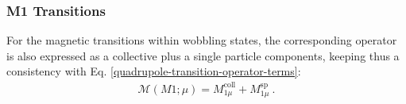 
\subsubsection{M1 Transitions}

For the magnetic transitions within wobbling states, the corresponding operator is also expressed as a collective plus a single particle components, keeping thus a consistency with Eq. \ref{quadrupole-transition-operator-terms}:
\begin{align}
    \mathcal{M}(M1;\mu)=M_{1\mu}^\text{coll}+M_{1\mu}^\text{sp}\ .
\end{align}